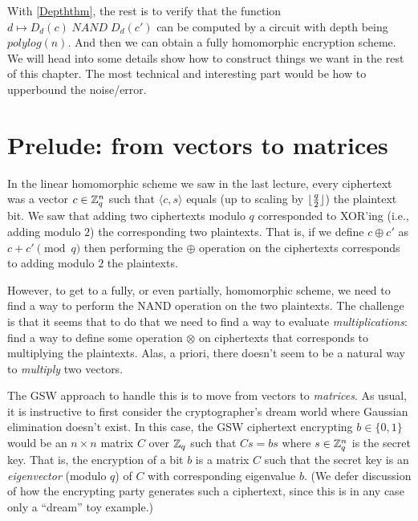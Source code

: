 With \cref{Depththm}, the rest is to verify that the function
\(d \mapsto D_d(c)\; \ensuremath{\mathit{NAND}}\; D_d(c')\) can be
computed by a circuit with depth being \(polylog(n)\). And then we can
obtain a fully homomorphic encryption scheme. We will head into some
details show how to construct things we want in the rest of this
chapter. The most technical and interesting part would be how to
upperbound the noise/error.

\section{Prelude: from vectors to
matrices}\label{17-Prelude-from-vectors-t}

In the linear homomorphic scheme we saw in the last lecture, every
ciphertext was a vector \(c\in{\mathbb{Z}}_q^n\) such that \(\langle c,s \rangle\)
equals (up to scaling by \(\lfloor \tfrac{q}{2} \rfloor\)) the plaintext bit. We
saw that adding two ciphertexts modulo \(q\) corresponded to XOR'ing
(i.e., adding modulo \(2\)) the corresponding two plaintexts. That is,
if we define \(c \oplus c'\) as \(c+c' \pmod{q}\) then performing the
\(\oplus\) operation on the ciphertexts corresponds to adding modulo
\(2\) the plaintexts.

However, to get to a fully, or even partially, homomorphic scheme, we
need to find a way to perform the NAND operation on the two plaintexts.
The challenge is that it seems that to do that we need to find a way to
evaluate \emph{multiplications}: find a way to define some operation
\(\otimes\) on ciphertexts that corresponds to multiplying the
plaintexts. Alas, a priori, there doesn't seem to be a natural way to
\emph{multiply} two vectors.

The GSW approach to handle this is to move from vectors to
\emph{matrices}. As usual, it is instructive to first consider the
cryptographer's dream world where Gaussian elimination doesn't exist. In
this case, the GSW ciphertext encrypting \(b\in\{0,1\}\) would be an
\(n\times n\) matrix \(C\) over \({\mathbb{Z}}_q\) such that \(Cs = bs\) where
\(s\in{\mathbb{Z}}_q^n\) is the secret key. That is, the encryption of a bit \(b\)
is a matrix \(C\) such that the secret key is an \emph{eigenvector}
(modulo \(q\)) of \(C\) with corresponding eigenvalue \(b\). (We defer
discussion of how the encrypting party generates such a ciphertext,
since this is in any case only a ``dream'' toy example.)


